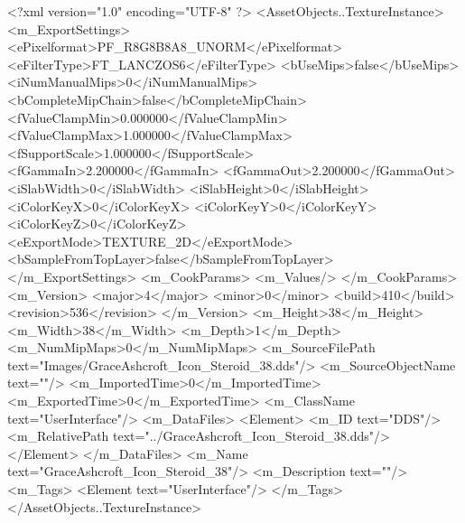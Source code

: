 <?xml version="1.0" encoding="UTF-8" ?>
<AssetObjects..TextureInstance>
	<m_ExportSettings>
		<ePixelformat>PF_R8G8B8A8_UNORM</ePixelformat>
		<eFilterType>FT_LANCZOS6</eFilterType>
		<bUseMips>false</bUseMips>
		<iNumManualMips>0</iNumManualMips>
		<bCompleteMipChain>false</bCompleteMipChain>
		<fValueClampMin>0.000000</fValueClampMin>
		<fValueClampMax>1.000000</fValueClampMax>
		<fSupportScale>1.000000</fSupportScale>
		<fGammaIn>2.200000</fGammaIn>
		<fGammaOut>2.200000</fGammaOut>
		<iSlabWidth>0</iSlabWidth>
		<iSlabHeight>0</iSlabHeight>
		<iColorKeyX>0</iColorKeyX>
		<iColorKeyY>0</iColorKeyY>
		<iColorKeyZ>0</iColorKeyZ>
		<eExportMode>TEXTURE_2D</eExportMode>
		<bSampleFromTopLayer>false</bSampleFromTopLayer>
	</m_ExportSettings>
	<m_CookParams>
		<m_Values/>
	</m_CookParams>
	<m_Version>
		<major>4</major>
		<minor>0</minor>
		<build>410</build>
		<revision>536</revision>
	</m_Version>
	<m_Height>38</m_Height>
	<m_Width>38</m_Width>
	<m_Depth>1</m_Depth>
	<m_NumMipMaps>0</m_NumMipMaps>
	<m_SourceFilePath text="Images/GraceAshcroft_Icon_Steroid_38.dds"/>
	<m_SourceObjectName text=""/>
	<m_ImportedTime>0</m_ImportedTime>
	<m_ExportedTime>0</m_ExportedTime>
	<m_ClassName text="UserInterface"/>
	<m_DataFiles>
		<Element>
			<m_ID text="DDS"/>
			<m_RelativePath text="../GraceAshcroft_Icon_Steroid_38.dds"/>
		</Element>
	</m_DataFiles>
	<m_Name text="GraceAshcroft_Icon_Steroid_38"/>
	<m_Description text=""/>
	<m_Tags>
		<Element text="UserInterface"/>
	</m_Tags>
</AssetObjects..TextureInstance>
